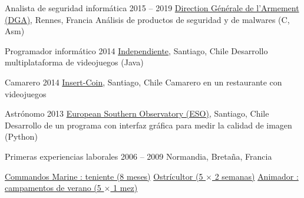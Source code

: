 \begin{joblist}[12.8][8.4][3.5]

\setlength{\parskip}{0.4cm}
\vspace{-0.4cm}

\item[Analista de seguridad informática]{2015 -- 2019}
	{
  \href{http://www.defense.gouv.fr/dga/}{Direction Générale de l'Armement (DGA)}, Rennes, Francia
	}
  {Análisis de productos de seguridad y de malwares (C, Asm)}


\item[Programador informático]{2014}
	{
	\href{https://tinmarino.github.io/Page/}{Independiente}, Santiago, Chile
	}
	{Desarrollo multiplataforma de videojuegos (Java)}


\item[Camarero]{2014}
	{
	\href{http://www.insertcoin.cl/}{Insert-Coin}, Santiago, Chile
	}
	{Camarero en un restaurante con videojuegos}


\item[Astrónomo]{2013}
	{
	\href{http://www.eso.org/public/}{European Southern Observatory (ESO)}, Santiago, Chile
	}
  {Desarrollo de un programa con interfaz gráfica para medir la calidad de imagen (Python)}

	
\item[Primeras experiencias laborales]{2006 -- 2009}
	{
	Normandia, Bretaña, Francia
	}
	{
    \renewcommand\labelitemi{{\boldmath$\cdot$}}
		\vspace{-0.8cm}
    \setlength{\parskip}{0cm}
		\begin{itemize}
		\setlength\itemsep{0cm}
    \cvitem \href{http://www.defense.gouv.fr/marine/organisation/forces/fusiliers-marins-et-commandos/force-maritime-des-fusiliers-marins-et-commandos}{Commandos Marine : teniente (8 meses)}
    \cvitem \href{http://huitresdesaintvaast.fr/}{Ostrícultor (5 $\times$ 2 semanas)}
    \cvitem \href{http://www.vacances-pour-tous.org/}{Animador : campamentos de verano (5 $\times$ 1 mez)}
		\end{itemize}
  }

	
\end{joblist}


